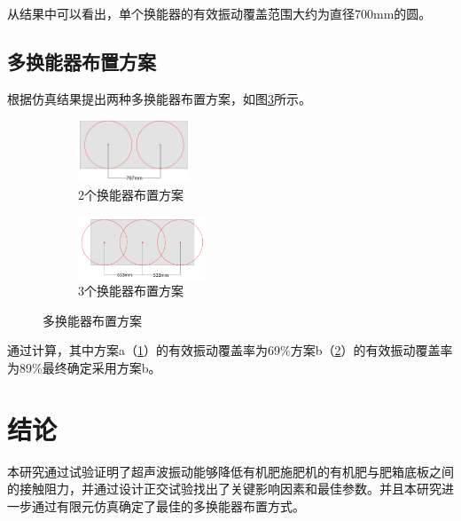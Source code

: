 \documentclass[fontset=windows,12pt,a4paper,titlepage,UTF8]{ctexart}
\begin{document}
从结果中可以看出，单个换能器的有效振动覆盖范围大约为直径700mm的圆。

\subsection{多换能器布置方案}

根据仿真结果提出两种多换能器布置方案，如图\ref{pic:多换能器布置方案}所示。

\begin{figure}[h]
  \centering
  \begin{subfigure}{0.4\textwidth}
    \centering
    \includegraphics[height=5em]{assets/2transducer.pdf}
    \caption{2个换能器布置方案}
    \label{pic:2个换能器布置方案}
  \end{subfigure}
  \hfill
  \begin{subfigure}{0.5\textwidth}
    \centering
    \includegraphics[height=5em]{assets/3transducer.pdf}
    \caption{3个换能器布置方案}
    \label{pic:3个换能器布置方案}
  \end{subfigure}
  \caption{多换能器布置方案}
  \label{pic:多换能器布置方案}
\end{figure}

通过计算，其中方案a（\ref{pic:2个换能器布置方案}）的有效振动覆盖率为69\%方案b（\ref{pic:3个换能器布置方案}）的有效振动覆盖率为89\%最终确定采用方案b。

\section{结论}

本研究通过试验证明了超声波振动能够降低有机肥施肥机的有机肥与肥箱底板之间的接触阻力，并通过设计正交试验找出了关键影响因素和最佳参数。并且本研究进一步通过有限元仿真确定了最佳的多换能器布置方式。
\end{document}
